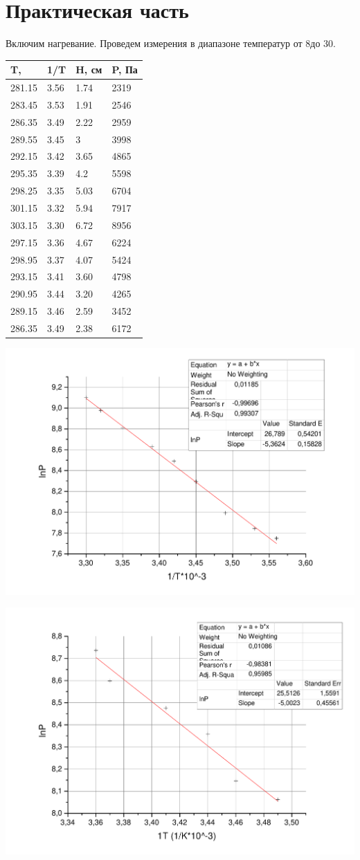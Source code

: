 \documentclass[a4paper,12pt]{article}
\begin{document}
	\section{Практическая часть}
		Включим нагревание. Проведем измерения в диапазоне температур от 8\celsius до 30\celsius.
		\begin{center}
			\begin{tabular}{|l|l|l|l|}
				T, \celsius      & 1/T  & H, см    & P,  Па    \\ \hline
				281.15 & 3.56 & 1.74 & 2319 \\
				283.45 & 3.53 & 1.91 & 2546 \\
				286.35 & 3.49 & 2.22 & 2959 \\
				289.55 & 3.45 & 3    & 3998 \\
				292.15 & 3.42 & 3.65 & 4865 \\
				295.35 & 3.39 & 4.2  & 5598 \\
				298.25 & 3.35 & 5.03 & 6704 \\
				301.15 & 3.32 & 5.94 & 7917 \\
				303.15 & 3.30 & 6.72 & 8956 \\ \hline
				297.15 & 3.36 & 4.67 & 6224 \\
				298.95 & 3.37 & 4.07 & 5424 \\
				293.15 & 3.41 & 3.60 & 4798 \\
				290.95 & 3.44 & 3.20 & 4265 \\
				289.15 & 3.46 & 2.59 & 3452 \\
				286.35 & 3.49 & 2.38 & 6172 \\ \hline
			\end{tabular}
		\end{center}
	\begin{center}
		\includegraphics[width = 0.7\linewidth]{up}
		
		\includegraphics[width = 0.7\linewidth]{down}
	\end{center}
\end{document}
